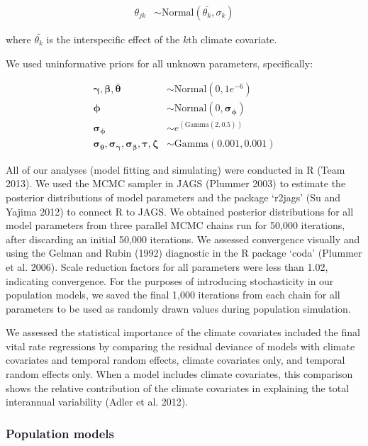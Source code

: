 \documentclass[12pt,]{article}
\begin{document}
\begin{align}
\theta_{jk} &\sim \text{Normal}(\bar{\theta_{k}}, \sigma_{k})
\end{align}

where $\bar{\theta_{k}}$ is the interspecific effect of the $k$th
climate covariate.

We used uninformative priors for all unknown parameters, specifically:

\begin{align}
\boldsymbol{\gamma, \beta, \bar{\theta}} &\sim \text{Normal}(0, 1e^{-6}) \\
\boldsymbol{\phi} &\sim \text{Normal}(0, \boldsymbol{\sigma_{\phi}}) \\
\boldsymbol{\sigma_{\phi}} &\sim e^{(\text{Gamma}(2, 0.5))} \\
\boldsymbol{\sigma_{\theta}, \sigma_{\gamma}, \sigma_{\beta}, \tau, \zeta} &\sim \text{Gamma}(0.001, 0.001)
\end{align}

All of our analyses (model fitting and simulating) were conducted in R
(Team 2013). We used the MCMC sampler in JAGS (Plummer 2003) to estimate
the posterior distributions of model parameters and the package `r2jags'
(Su and Yajima 2012) to connect R to JAGS. We obtained posterior
distributions for all model parameters from three parallel MCMC chains
run for 50,000 iterations, after discarding an initial 50,000
iterations. We assessed convergence visually and using the Gelman and
Rubin (1992) diagnostic in the R package `coda' (Plummer et al. 2006).
Scale reduction factors for all parameters were less than 1.02,
indicating convergence. For the purposes of introducing stochasticity in
our population models, we saved the final 1,000 iterations from each
chain for all parameters to be used as randomly drawn values during
population simulation.

We assessed the statistical importance of the climate covariates
included the final vital rate regressions by comparing the residual
deviance of models with climate covariates and temporal random effects,
climate covariates only, and temporal random effects only. When a model
includes climate covariates, this comparison shows the relative
contribution of the climate covariates in explaining the total
interannual variability (Adler et al. 2012).

\subsubsection{Population models}\label{population-models}
\end{document}

